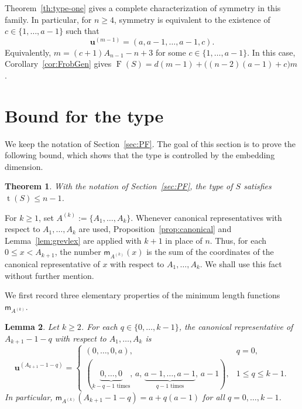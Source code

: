 \documentclass[12pt,a4paper]{amsart}
\newtheorem{theorem}{Theorem}[section]
\newtheorem{lemma}[theorem]{Lemma}
\theoremstyle{definition}
\begin{document}
Theorem~\ref{th:type-one} gives a complete characterization of symmetry
in this family. In particular, for $n\ge 4$, symmetry is equivalent to
the existence of $c\in\{1,\ldots,a-1\}$ such that
\[
\mathbf u^{(m-1)}=(a,a-1,\ldots,a-1,c).
\]
Equivalently, $m=(c+1)A_{n-1}-n+3$ for some
$c\in\{1,\ldots,a-1\}$. In this case, Corollary~\ref{cor:FrobGen} gives
$\operatorname{F}(S) = d(m-1)+\bigl((n-2)(a-1)+c\bigr)m$.

\section{Bound for the type}\label{sec:type_bound}

We keep the notation of Section~\ref{sec:PF}. The goal of this section is to prove the following bound, which shows that the type is controlled by the embedding dimension.

\begin{theorem}\label{thm:type-bound}
With the notation of Section~\ref{sec:PF}, the type of $S$ satisfies $\operatorname{t}(S)\le n-1$.
\end{theorem}

For $k\ge 1$, set $A^{(k)}:=\{A_1,\ldots,A_k\}$. Whenever canonical representatives with respect to $A_1,\ldots,A_k$ are used, Proposition~\ref{prop:canonical} and Lemma~\ref{lem:grevlex} are applied with $k+1$ in place of $n$. Thus, for each $0\le x<A_{k+1}$, the number $\mathsf m_{A^{(k)}}(x)$ is the sum of the coordinates of the canonical representative of $x$ with respect to $A_1,\ldots,A_k$. We shall use this fact without further mention.

We first record three elementary properties of the minimum length functions $\mathsf m_{A^{(k)}}$.

\begin{lemma}\label{lem:full-level-canonical-vectors}
Let $k\ge 2$. For each $q\in\{0,\ldots,k-1\}$, the canonical representative of $A_{k+1}-1-q$ with respect to $A_1,\ldots,A_k$ is
\[
\mathbf u^{(A_{k+1}-1-q)}=
\begin{cases}
(0,\ldots,0,a), & q=0,\\[1mm]
(\underbrace{0,\ldots,0}_{k-q-1\text{ times}},\,a,\,
\underbrace{a-1,\ldots,a-1}_{q-1\text{ times}},\,a-1), & 1\le q\le k-1.
\end{cases}
\]
In particular, $\mathsf m_{A^{(k)}}(A_{k+1}-1-q)=a+q(a-1)$ for all $q=0,\ldots,k-1$.
\end{lemma}
\end{document}
